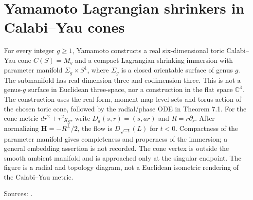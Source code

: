 \chapter{Yamamoto Lagrangian shrinkers in Calabi--Yau cones}\label{sec:catalogue-yamamoto-cone-shrinkers}
\begin{example}\label{ex:catalogue-yamamoto-cone-shrinkers}
For every integer $g\ge1$, Yamamoto constructs a real six-dimensional toric Calabi--Yau cone $C(S)=M_g$ and a compact Lagrangian shrinking immersion with parameter manifold $\Sigma_g\times S^1$, where $\Sigma_g$ is a closed orientable surface of genus $g$. The submanifold has real dimension three and codimension three. This is not a genus-$g$ surface in Euclidean three-space, nor a construction in the flat space $\mathbb C^3$.
The construction uses the real form, moment-map level sets and torus action of the chosen toric cone, followed by the radial/phase ODE in Theorem 7.1. For the cone metric $dr^2+r^2g_S$, write $D_a(s,r)=(s,ar)$ and $R=r\partial_r$. After normalizing $\mathbf H=-R^\perp/2$, the flow is $D_{\sqrt{-t}}(L)$ for $t<0$. Compactness of the parameter manifold gives completeness and properness of the immersion; a general embedding assertion is not recorded. The cone vertex is outside the smooth ambient manifold and is approached only at the singular endpoint. The figure is a radial and topology diagram, not a Euclidean isometric rendering of the Calabi--Yau metric.
\par Sources: \cite{CatYamamoto2012}.
\end{example}

